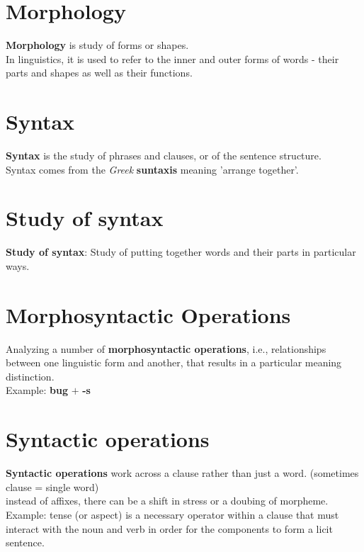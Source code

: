 \section{Morphology}\label{Language: Morphology}
\textbf{Morphology} is study of forms or shapes.\\
In linguistics, it is used to refer to the inner and outer forms of words - their parts and shapes as well as their functions.



\section{Syntax}\label{Language: Syntax}
    \textbf{Syntax} is the study of phrases and clauses, or of the sentence structure.\\ Syntax comes from the \textit{Greek} \textbf{suntaxis} meaning 'arrange together'.

\section{Study of syntax}\label{Language: Study of syntax}
    \textbf{Study of syntax}: Study of putting together words and their parts in particular ways.

\section{Morphosyntactic Operations} \label{morphosyntactic operations}
    Analyzing a number of \textbf{morphosyntactic operations}, i.e., relationships between one linguistic form and another, that results in a particular meaning distinction. \\ Example: \textbf{bug} $+$ \textbf{-s}
        

\section{Syntactic operations}\label{Syntactic operations}
    \item \textbf{Syntactic operations} work across a clause rather than just a word. (sometimes clause = single word)\\
    instead of affixes, there can be a shift in stress or a doubing of morpheme.\\
    Example: tense (or aspect)  \label{Syntactic operations: aspect/ tense} is a necessary operator within a clause that must interact with the noun and verb in order for the components to form a licit sentence.

